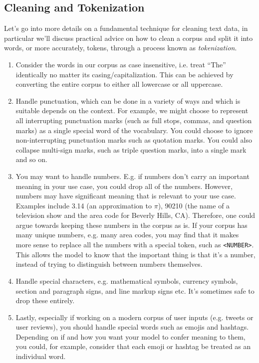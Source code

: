 \documentclass[12pt]{article}
\begin{document}
\subsection{Cleaning and Tokenization} Let's go into more details on a fundamental technique for cleaning text data, in particular we'll discuss practical advice on how to clean a corpus and split it into words, or more accurately, tokens, through a process known as \emph{tokenization}.
\begin{enumerate}
\item Consider the words in our corpus as case insensitive, i.e. treat ``The'' identically no matter its casing/capitalization. This can be achieved by converting the entire corpus to either all lowercase or all uppercase.
\item Handle punctuation, which can be done in a variety of ways and which is suitable depends on the context. For example, we might choose to represent all interrupting punctuation marks (such as full stops, commas, and question marks) as a single special word of the vocabulary. You could choose to ignore non-interrupting punctuation marks such as quotation marks. You could also collapse multi-sign marks, such as triple question marks, into a single mark and so on.
\item You may want to handle numbers. E.g. if numbers don't carry an important meaning in your use case, you could drop all of the numbers. However, numbers may have significant meaning that is relevant to your use case. Examples include 3.14 (an approximation to $\pi$), 90210 (the name of a television show and the area code for Beverly Hills, CA). Therefore, one could argue towards keeping these numbers in the corpus as is. If your corpus has many unique numbers, e.g. many area codes, you may find that it makes more sense to replace all the numbers with a special token, such as \texttt{<NUMBER>}. This allows the model to know that the important thing is that it's a number, instead of trying to distinguish between numbers themselves.
\item Handle special characters, e.g. mathematical symbols, currency symbols, section and paragraph signs, and line markup signs etc. It's sometimes safe to drop these entirely.
\item Lastly, especially if working on a modern corpus of user inputs (e.g. tweets or user reviews), you should handle special words such as emojis and hashtags. Depending on if and how you want your model to confer meaning to them, you could, for example, consider that each emoji or hashtag be treated as an individual word.
\end{enumerate}
\end{document}
